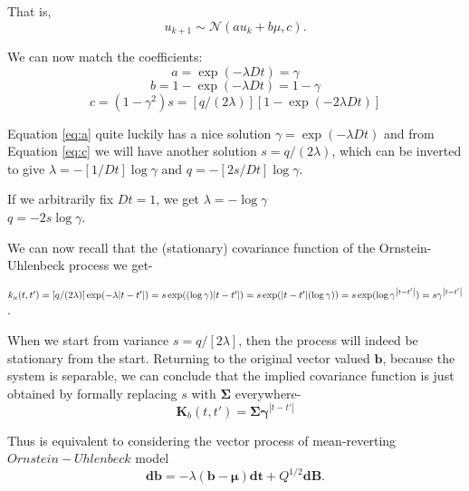 That is,
\begin{equation}
u_{k+1} \sim \mathcal{N}\left(a u_k + b \mu, c\right).
\end{equation}

We can now match the coefficients:
\begin{equation} \label{eq:a}
a = \exp(-\lambda Dt) = \gamma
\end{equation}
\begin{equation} \label{eq:b}
b = 1 - \exp(-\lambda Dt) = 1 - \gamma
\end{equation}
\begin{equation} \label{eq:c}
c = (1 - \gamma^2) s = [q / (2 \lambda)] [1 - \exp(-2 \lambda Dt)]
\end{equation}

Equation \ref{eq:a} quite luckily has a nice solution 
$\gamma = \exp(-\lambda Dt)$ and from Equation \ref{eq:c} we will have another solution
$s = q / (2 \lambda)$,
which can be inverted to give
$\lambda = -[1 / Dt] \log \gamma$ and
$q = -[2 s / Dt] \log \gamma$. 

If we arbitrarily fix $Dt = 1$, we get
$\lambda = -\log \gamma$\\
$q = -2 s \log \gamma$.

We can now recall that the (stationary) covariance function of the Ornstein-Uhlenbeck process we get-

$k_u(t,t')
  = [q / (2 \lambda)] \exp(-\lambda {\left|t-t'\right|})\\
  = s \exp((\log \gamma) {\left|t-t'\right|})\\
  = s \exp({\left|t-t'\right|}(\log \gamma))\\
  = s \exp(\log \gamma^{\left|t-t'\right|})\\
  = s \gamma^{\left|t-t'\right|}$.

When we start from variance $s = q / \left[2 \lambda\right]$, then the process will indeed be stationary from the start. Returning to the original vector valued $\textbf{b}$, because the system is separable, we can conclude that the implied covariance function is just obtained by formally replacing $s$ with $\boldsymbol{\Sigma}$ everywhere- 
\begin{equation}
\textbf{K}_b(t,t') = \boldsymbol{\Sigma} \boldsymbol{\gamma}^{\left|t-t'\right|}
\end{equation}

Thus is equivalent to considering the vector process of mean-reverting $Ornstein-Uhlenbeck$ model
\begin{equation}
\textbf{db} = -\lambda (\textbf{b} - \boldsymbol{\mu}) \textbf{dt} + Q^{1/2} \textbf{dB}.
\end{equation}

